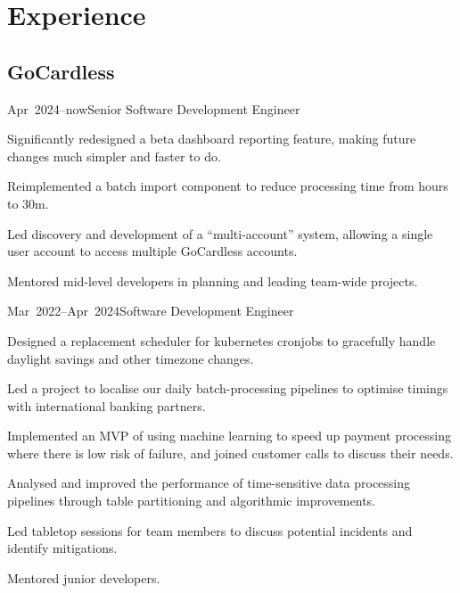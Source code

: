 \documentclass[a4paper]{barrucadu-cv}
\newcommand{\range}[2]{#1–#2}
\newcommand{\orange}[1]{\range{#1}{now}}
\begin{document}
\section{Experience}

\subsection{GoCardless}
\begin{cventry}{\orange{Apr~2024}}{Senior Software Development Engineer}
  \begin{tightitemize}
  \item Significantly redesigned a beta dashboard reporting feature, making future changes much simpler and faster to do.
  \item Reimplemented a batch import component to reduce processing time from hours to 30m.
  \item Led discovery and development of a ``multi-account'' system, allowing a single user account to access multiple GoCardless accounts.
  \item Mentored mid-level developers in planning and leading team-wide projects.
  \end{tightitemize}
\end{cventry}

\begin{cventry}{\range{Mar~2022}{Apr~2024}}{Software Development Engineer}
  \begin{tightitemize}
  \item Designed a replacement scheduler for kubernetes cronjobs to gracefully handle daylight savings and other timezone changes.
  \item Led a project to localise our daily batch-processing pipelines to optimise timings with international banking partners.
  \item Implemented an MVP of using machine learning to speed up payment processing where there is low risk of failure, and joined customer calls to discuss their needs.
  \item Analysed and improved the performance of time-sensitive data processing pipelines through table partitioning and algorithmic improvements.
  \item Led tabletop sessions for team members to discuss potential incidents and identify mitigations.
  \item Mentored junior developers.
  \end{tightitemize}
\end{cventry}
\end{document}

